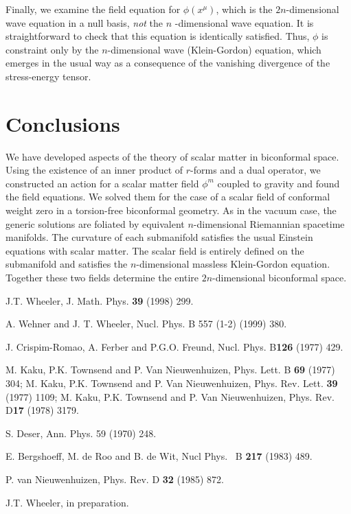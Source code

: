 \documentclass[a4paper,a4paper]{article}
\begin{document}
\smallskip

Finally, we examine the field equation for $\phi (x^{\mu })$, which is the $%
2n$-dimensional wave equation in a null basis, \textit{not }the $n$%
-dimensional wave equation. It is straightforward to check that this
equation is identically satisfied. Thus, $\phi $ is constraint only by the $%
n $-dimensional wave (Klein-Gordon) equation, which emerges in the usual way
as a consequence of the vanishing divergence of the stress-energy tensor.

\section{Conclusions}

We have developed aspects of the theory of scalar matter in biconformal
space. Using the existence of an inner product of $r$-forms and a dual
operator, we constructed an action for a scalar matter field $\phi ^{m}$
coupled to gravity and found the field equations. We solved them for the
case of a scalar field of conformal weight zero in a torsion-free
biconformal geometry. As in the vacuum case, the generic solutions are
foliated by equivalent $n$-dimensional Riemannian spacetime manifolds. The
curvature of each submanifold satisfies the usual Einstein equations with
scalar matter. The scalar field is entirely defined on the submanifold and
satisfies the $n$-dimensional massless Klein-Gordon equation. Together these
two fields determine the entire $2n$-dimensional biconformal space.

\begin{thebibliography}{9}
  J.T. Wheeler, J. Math. Phys. \textbf{%
39} (1998) 299.

  A. Wehner and J. T. Wheeler, Nucl. Phys. B 557 (1-2) (1999) 380.

  J. Crispim-Romao, A. Ferber and P.G.O.
Freund, Nucl. Phys. B\textbf{126} (1977) 429.

  M. Kaku, P.K. Townsend and P. Van Nieuwenhuizen,
Phys. Lett. B \textbf{69 }(1977) 304; M. Kaku, P.K. Townsend and P. Van
Nieuwenhuizen, Phys. Rev. Lett. \textbf{39} (1977) 1109; M. Kaku, P.K.
Townsend and P. Van Nieuwenhuizen, Phys. Rev. D\textbf{17} (1978) 3179.

  S. Deser, Ann. Phys. 59 (1970) 248.

  E. Bergshoeff, M. de Roo and B. de Wit, Nucl Phys. \ B%
\textbf{217} (1983) 489.

  P. van Nieuwenhuizen, Phys. Rev. D \textbf{32}
(1985) 872.

  J.T. Wheeler, in preparation.
\end{thebibliography}
\end{document}
